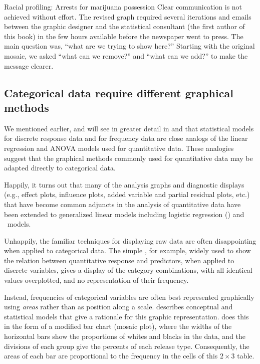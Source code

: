 \documentclass[11pt]{book}
\begin{document}
\begin{Example}[arrests0]{Racial profiling: Arrests for marijuana possession}
Clear communication is not achieved without effort.  The revised graph required several iterations
and emails between the graphic designer and the statistical consultant (the first author of this book)
in the few hours available before the newspaper went to press.
The main question was, ``what are we trying to show here?'' Starting with the original
 mosaic, we asked ``what can we remove?'' and ``what can we add?''
to make the message clearer.

\end{Example}


\subsection{Categorical data require different graphical methods}\label{sec:intro-catdata}

We mentioned earlier, and will see in greater detail 
in  and  
that statistical models for discrete
response data and for frequency 
data are close analogs of the linear regression and ANOVA models
used for quantitative data.
These analogies suggest that the graphical methods
commonly used for quantitative data may be adapted directly to
categorical data.

Happily, it turns out that many of the analysis graphs and diagnostic
displays (e.g., effect plots,
influence plots, added variable and partial residual
plots, etc.)
that have become common adjuncts in the analysis of
quantitative data have been extended to generalized linear models
including logistic regression ()
and \loglin\ models.

Unhappily, the familiar techniques for displaying raw data are
often disappointing when applied to categorical data.
The simple \scat, for example, widely used to show
the relation between
quantitative response and predictors, when applied to discrete
variables, gives a display of the category combinations, 
with all identical values overplotted, and no representation of
their frequency.

Instead, frequencies of categorical variables are often best 
represented graphically using \emph{areas} rather than as
position along a scale. \citet{Friendly:95} describes 
conceptual and statistical models that give a rationale
for this graphic representation.
 does this in the form of a 
modified bar chart (mosaic plot), where the widths of the horizontal
bars show the proportions of whites and blacks in the data, and
the divisions of each group give the percents of each release type.
Consequently, the areas of each bar are proportional to the
frequency in the cells of this $2 \times 3$ table.
\end{document}
